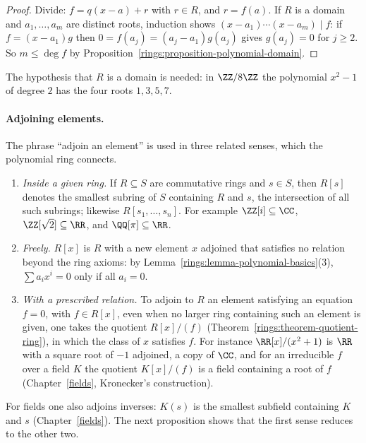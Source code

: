 \begin{proof}
Divide: $f = q(x - a) + r$ with $r \in R$, and $r = f(a)$. If $R$ is a domain and
$a_1, \ldots, a_m$ are distinct roots, induction shows
$(x - a_1) \cdots (x - a_m) \mid f$: if $f = (x - a_1)g$ then $0 = f(a_j) = (a_j - a_1)g(a_j)$
gives $g(a_j) = 0$ for $j \geq 2$. So $m \leq \deg f$ by
Proposition~\ref{rings:proposition-polynomial-domain}.
\end{proof}

\begin{counterexample}\label{rings:counterexample-many-roots}
The hypothesis that $R$ is a domain is needed: in $\ZZ/8\ZZ$ the polynomial $x^2 - 1$ of
degree $2$ has the four roots $1, 3, 5, 7$.
\end{counterexample}

\paragraph{Adjoining elements.} The phrase ``adjoin an element'' is used in three related senses, which the polynomial ring connects.
\begin{enumerate}
\item \emph{Inside a given ring.} If $R \subseteq S$ are commutative rings and $s \in S$, then $R[s]$ denotes the smallest subring of $S$ containing $R$ and $s$, the intersection of all such subrings; likewise $R[s_1, \ldots, s_n]$. For
example $\ZZ[i] \subseteq \CC$, $\ZZ[\sqrt 2] \subseteq \RR$, and $\QQ[\pi] \subseteq \RR$.
\item \emph{Freely.} $R[x]$ is $R$ with a new element $x$ adjoined that satisfies no relation beyond the ring axioms: by Lemma~\ref{rings:lemma-polynomial-basics}(3), $\sum a_ix^i = 0$ only if all $a_i = 0$.
\item \emph{With a prescribed relation.} To adjoin to $R$ an element satisfying an equation $f = 0$, with $f \in R[x]$, even when no larger ring containing such an element is given, one takes the quotient $R[x]/(f)$
(Theorem~\ref{rings:theorem-quotient-ring}), in which the class of $x$ satisfies $f$. For instance $\RR[x]/(x^2 + 1)$ is $\RR$ with a square root of $-1$ adjoined, a copy of $\CC$, and for an irreducible $f$ over a field $K$
the quotient $K[x]/(f)$ is a field containing a root of $f$ (Chapter~\ref{fields}, Kronecker's construction).
\end{enumerate}
For fields one also adjoins inverses: $K(s)$ is the smallest subfield containing $K$ and $s$ (Chapter~\ref{fields}). The next proposition shows that the first sense reduces to the other two.

